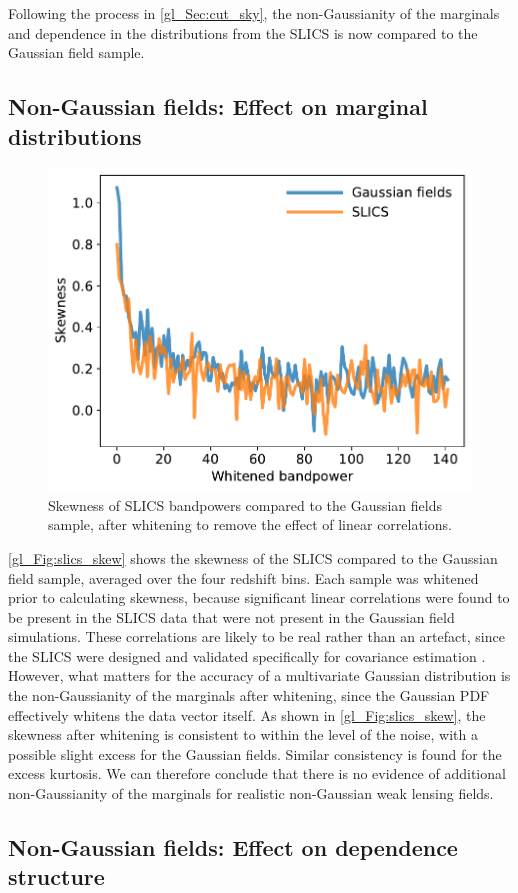 Following the process in \autoref{gl_Sec:cut_sky}, the non-Gaussianity of the marginals and dependence in the distributions from the SLICS is now compared to the Gaussian field sample.

\subsection{Non-Gaussian fields: Effect on marginal distributions}

\begin{figure}
\centering
\includegraphics[width=.5\textwidth]{slics_skew}
\caption{Skewness of SLICS bandpowers compared to the Gaussian fields sample, after whitening to remove the effect of linear correlations.}
\label{gl_Fig:slics_skew}
\end{figure}

\autoref{gl_Fig:slics_skew} shows the skewness of the SLICS compared to the Gaussian field sample, averaged over the four redshift bins. Each sample was whitened prior to calculating skewness, because significant linear correlations were found to be present in the SLICS data that were not present in the Gaussian field simulations. These correlations are likely to be real rather than an artefact, since the SLICS were designed and validated specifically for covariance estimation \citep{Harnois-Deraps2015}. However, what matters for the accuracy of a multivariate Gaussian distribution is the non-Gaussianity of the marginals after whitening, since the Gaussian PDF effectively whitens the data vector itself. As shown in \autoref{gl_Fig:slics_skew}, the skewness after whitening is consistent to within the level of the noise, with a possible slight excess for the Gaussian fields. Similar consistency is found for the excess kurtosis. We can therefore conclude that there is no evidence of additional non-Gaussianity of the marginals for realistic non-Gaussian weak lensing fields.

\subsection{Non-Gaussian fields: Effect on dependence structure}


